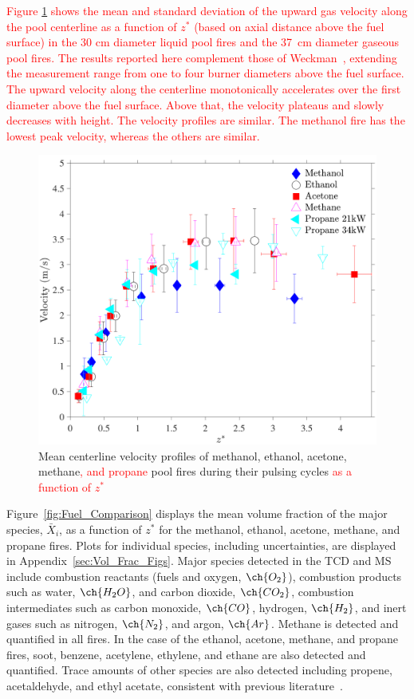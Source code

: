 \documentclass[12pt]{article}
\begin{document}
\textcolor{red}{Figure \ref{fig:Vel_Comparison} shows the mean and standard deviation of the upward gas velocity along the pool centerline as a function of $z^*$ (based on axial distance above the fuel surface) in the 30 cm diameter liquid pool fires and the 37~cm diameter gaseous pool fires. The results reported here complement those of Weckman~\cite{Weckman1996}, extending the measurement range from one to four burner diameters above the fuel surface. The upward velocity along the centerline monotonically accelerates over the first diameter above the fuel surface. Above that, the velocity plateaus and slowly decreases with height. The velocity profiles are similar. The methanol fire has the lowest peak velocity, whereas the others are similar.}


\begin{figure}[h!]
	\centering
\includegraphics[width=10.0 cm, keepaspectratio]{Velocity_Comparison.pdf}
	\caption[Mean centerline velocity profiles]{Mean centerline velocity profiles of methanol, ethanol, acetone, methane\textcolor{red}{, and propane} pool fires during their pulsing cycles \textcolor{red}{ as a function of $z^*$}}
	\label{fig:Vel_Comparison}
\end{figure}

Figure~\ref{fig:Fuel_Comparison} displays the mean volume fraction of the major species, $\bar{X}_{i}$, as a function of $z^*$ for the methanol, ethanol, acetone, methane, and propane fires. Plots for individual species, including uncertainties, are displayed in Appendix~\ref{sec:Vol_Frac_Figs}. Major species detected in the TCD and MS include combustion reactants (fuels and oxygen, $\ch{O_2}$), combustion products such as water, $\ch{H_{2}O}$, and carbon dioxide, $\ch{CO_{2}}$, combustion intermediates such as carbon monoxide, $\ch{CO}$, hydrogen, $\ch{H_{2}}$, and inert gases such as nitrogen, $\ch{N_{2}}$, and argon, $\ch{Ar}$. Methane is detected and quantified in all fires. In the case of the ethanol, acetone, methane, and propane fires, soot, benzene, acetylene, ethylene, and ethane are also detected and quantified. Trace amounts of other species are also detected including propene, acetaldehyde, and ethyl acetate, consistent with previous literature~\cite{Pichon2009, Gong2015}.
\end{document}
